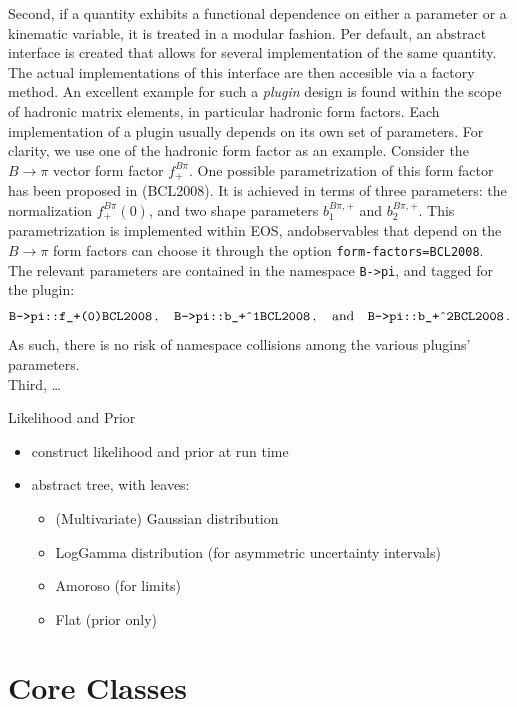 Second, if a quantity exhibits a functional dependence on either a parameter or
a kinematic variable, it is treated in a modular fashion. Per default, an
abstract interface is created that allows for several implementation of the
same quantity. The actual implementations of this interface are then accesible
via a factory method. An excellent example for such a \emph{plugin} design is
found within the scope of hadronic matrix elements, in particular hadronic form
factors. Each implementation of a plugin usually depends on its own set of
parameters. For clarity, we use one of the hadronic form factor as an example.
Consider the $B\to \pi$ vector form factor $f^{B\pi}_+$. One possible
parametrization of this form factor has been proposed in \cite{Bourrely:2008za}
(BCL2008). It is achieved in terms of three parameters: the normalization
$f^{B\pi}_+(0)$, and two shape parameters $b^{B\pi,+}_1$ and $b^{B\pi,+}_2$.
This parametrization is implemented within EOS, andobservables that depend on
the $B\to \pi$ form factors can choose it through the option
\texttt{form-factors=BCL2008}. The relevant parameters are contained in the
namespace \texttt{B->pi}, and tagged for the  plugin:
\begin{equation}
    \texttt{B->pi::f\_+(0)\@BCL2008}\,,\quad\texttt{B->pi::b\_+\^{}1\@BCL2008}\,,
    \quad\text{and}\quad\texttt{B->pi::b\_+\^{}2\@BCL2008}\,.
\end{equation}
As such, there is no risk of namespace collisions among the various plugins'
parameters.\\


Third, \dots

{Likelihood and Prior}
\begin{itemize}
    \item construct likelihood and prior at run time
    \item abstract tree, with leaves:
    \begin{itemize}
        \item (Multivariate) Gaussian distribution
        \item LogGamma distribution (for asymmetric uncertainty intervals)
        \item Amoroso (for limits)
        \item Flat (prior only)
    \end{itemize}
\end{itemize}


\section{Core Classes}
\label{sec:interface:classes}

